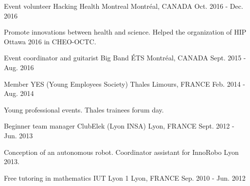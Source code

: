 


\begin{cventries}


\cventry
{Event volunteer} %
{Hacking Health Montreal} %
{Montréal, CANADA} %
{Oct. 2016 - Dec. 2016} %
{ %
\begin{cvitems}
\item {Promote innovations between health and science. Helped the organization of HIP Ottawa 2016 in CHEO-OCTC.}
\end{cvitems}
}

\cventry
{Event coordinator and guitarist} %
{Big Band ÉTS} %
{Montréal, CANADA} %
{Sept. 2015 - Aug. 2016} %
{ %
}

\vspace{-3mm}
\cventry
{Member} %
{YES (Young Employees Society) Thales} %
{Limours, FRANCE} %
{Feb. 2014 - Aug. 2014} %
{ %
\begin{cvitems}
\item {Young professional events. Thales trainees forum day.}
\end{cvitems}
}

\cventry
{Beginner team manager} %
{ClubElek (Lyon INSA)} %
{Lyon, FRANCE} %
{Sept. 2012 - Jun. 2013} %
{ %
\begin{cvitems}
\item{Conception of an autonomous robot. Coordinator assistant for InnoRobo Lyon 2013.}
\end{cvitems}
}

\cventry
{Free tutoring in mathematics} %
{IUT Lyon 1} %
{Lyon, FRANCE} %
{Sep. 2010 - Jun. 2012} %
{ %
}


\end{cventries}
